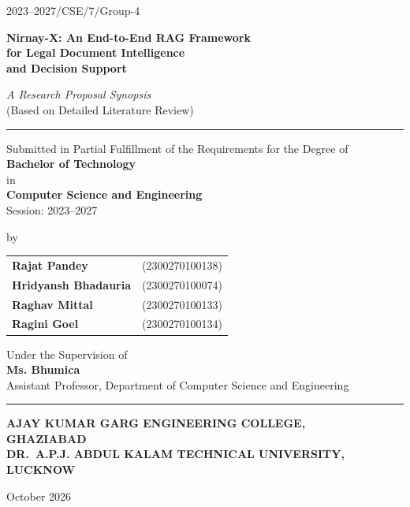 \documentclass[12pt,a4paper]{article}
\begin{document}
\begin{titlepage}
  \pagestyle{empty}
  \centering
  \vspace*{0.3cm}

  {\small 2023--2027/CSE/7/Group-4}

  \vspace{1cm}

  {\LARGE\bfseries Nirnay-X: An End-to-End RAG Framework\\[4pt]
   for Legal Document Intelligence\\[4pt]
   and Decision Support}

  \vspace{0.5cm}

  {\large\itshape A Research Proposal Synopsis}\\[4pt]
  {\normalsize (Based on Detailed Literature Review)}

  \vspace{0.8cm}
  \rule{0.6\textwidth}{0.4pt}
  \vspace{0.5cm}

  {\normalsize Submitted in Partial Fulfillment of the Requirements for the Degree of}\\[6pt]
  {\large\bfseries Bachelor of Technology}\\[4pt]
  {\normalsize in}\\[4pt]
  {\large\bfseries Computer Science and Engineering}\\[6pt]
  {\normalsize Session: 2023--2027}

  \vspace{0.8cm}
  {\normalsize by}

  \vspace{0.4cm}

  \begin{tabular}{ll}
    \textbf{Rajat Pandey}        & (2300270100138) \\[2pt]
    \textbf{Hridyansh Bhadauria} & (2300270100074) \\[2pt]
    \textbf{Raghav Mittal}       & (2300270100133) \\[2pt]
    \textbf{Ragini Goel}         & (2300270100134) \\
  \end{tabular}

  \vspace{0.8cm}
  {\normalsize Under the Supervision of}\\[6pt]
  {\large\bfseries Ms. Bhumica}\\[2pt]
  {\normalsize Assistant Professor, Department of Computer Science and Engineering}

  \vspace{1.0cm}
  \rule{0.8\textwidth}{0.6pt}
  \vspace{0.6cm}

  {\Large\bfseries AJAY KUMAR GARG ENGINEERING COLLEGE,\\
   GHAZIABAD}\\[6pt]
  {\large\bfseries DR.\ A.P.J. ABDUL KALAM TECHNICAL UNIVERSITY, LUCKNOW}

  \vspace{0.8cm}
  {\normalsize October 2026}
\end{titlepage}
\end{document}
